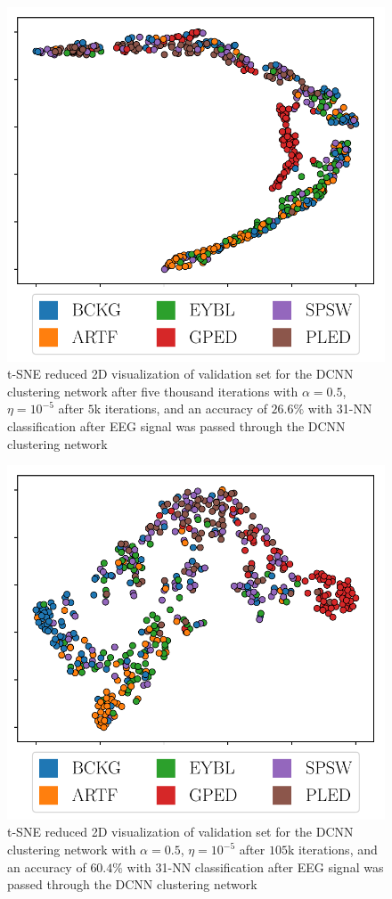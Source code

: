 \begin{figure}[!ht]
	\centering
	\includegraphics[width=0.65\linewidth]{pictures/tsne_plot_start.pdf}
	\caption[t-SNE visualization after $5$k iterations]{t-SNE reduced 2D visualization  of validation set for the DCNN clustering network after five thousand iterations with $\alpha = 0.5$, $\eta = 10^{-5}$ after $5$k iterations, and an accuracy of $26.6\%$ with 31-NN classification after EEG signal was passed through the DCNN clustering network}\label{fig:tsne_start}  
\end{figure}


\begin{figure}[!ht]
	\centering
	\includegraphics[width=0.65\linewidth]{pictures/tsne_plot.pdf}
	\caption[t-SNE visualization after $105$k iterations]{t-SNE reduced 2D visualization  of validation set for the DCNN clustering network with $\alpha = 0.5$, $\eta = 10^{-5}$ after $105$k iterations, and an accuracy of $60.4\%$ with 31-NN classification after EEG signal was passed through the DCNN clustering network}\label{fig:tsne}  
\end{figure}

